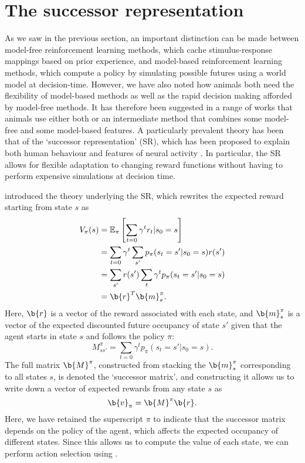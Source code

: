 \section{The successor representation}
\label{sec:SR}

As we saw in the previous section, an important distinction can be made between model-free reinforcement learning methods, which cache stimulus-response mappings based on prior experience, and model-based reinforcement learning methods, which compute a policy by simulating possible futures using a world model at decision-time.
However, we have also noted how animals both need the flexibility of model-based methods as well as the rapid decision making afforded by model-free methods.
It has therefore been suggested in a range of works that animals use either both or an intermediate method that combines some model-free and some model-based features.
A particularly prevalent theory has been that of the `successor representation' (SR), which has been proposed to explain both human behaviour \citep{momennejad2017successor} and features of neural activity \citep{stachenfeld2017hippocampus}.
In particular, the SR allows for flexible adaptation to changing reward functions without having to perform expensive simulations at decision time.

\citet{dayan1993improving} introduced the theory underlying the SR, which rewrites the expected reward starting from state $s$ as
\begin{align}
    V_\pi(s) &= \mathbb{E}_\pi \left [ \sum_{t = 0} \gamma^t r_t | s_0 = s\right ] \\
    &= \sum_{t = 0} \gamma^t \sum_{s'} p_\pi(s_t = s' | s_0 = s) r(s')\\
    &= \sum_{s'} r(s') \sum_t \gamma^t p_\pi(s_t = s' | s_0 = s)\\
    &= \b{r}^T \b{m}^\pi_s.
\end{align}
Here, $\b{r}$ is a vector of the reward associated with each state, and $\b{m}^\pi_s$ is a vector of the expected discounted future occupancy of state $s'$ given that the agent starts in state $s$ and follows the policy $\pi$:
\begin{equation}
    M^\pi_{s s'} = \sum_{t = 0} \gamma^t p_\pi(s_t = s' | s_0 = s).
\end{equation}
The full matrix $\b{M}^\pi$, constructed from stacking the $\b{m}^\pi_s$ corresponding to all states $s$, is denoted the `successor matrix', and constructing it allows us to write down a vector of expected rewards from any state $s$ as
\begin{equation}
    \b{v}_\pi = \b{M}^\pi \b{r}.
\end{equation}
Here, we have retained the superscript $\pi$ to indicate that the successor matrix depends on the policy of the agent, which affects the expected occupancy of different states.
Since this allows us to compute the value of each state, we can perform action selection using .

